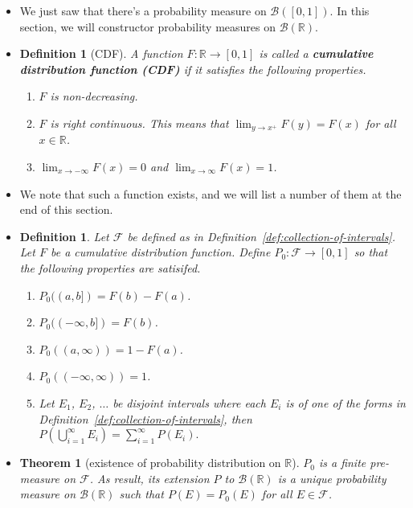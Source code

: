 \documentclass[10pt]{article}
\newtheorem{theorem}[lemma]{Theorem}
\newtheorem{definition}[lemma]{Definition}
\numberwithin{lemma}{section}
\newcommand{\mcal}[1]{\mathcal{#1}}
\newcommand{\Real}{\mathbb{R}}
\begin{document}
\begin{itemize}
  \item We just saw that there's a probability measure on $\mcal{B}([0,1])$. In this section, we will constructor probability measures on $\mcal{B}(\Real)$. 
    
  \item \begin{definition}[CDF] \label{def:cdf}
    A function $F: \Real \rightarrow [0,1]$ is called a {\bf cumulative distribution function (CDF)} if it satisfies the following properties.
    \begin{enumerate}
      \item $F$ is non-decreasing.
      \item $F$ is right continuous. This means that $\lim_{y \rightarrow x^+} F(y) = F(x)$ for all $x \in \Real$.
      \item $\lim_{x \rightarrow -\infty} F(x) = 0$ and $\lim_{x \rightarrow \infty} F(x) = 1$.
    \end{enumerate}
  \end{definition}

  \item We note that such a function exists, and we will list a number of them at the end of this section.

  \item \begin{definition}
    Let $\mcal{F}$ be defined as in Definition~\ref{def:collection-of-intervals}. Let $F$ be a cumulative distribution function. Define $P_0: \mcal{F} \rightarrow [0,1]$ so that the following properties are satisifed.
    \begin{enumerate}
      \item $P_0((a,b]) = F(b) - F(a)$.
      \item $P_0((-\infty,b]) = F(b)$.
      \item $P_0((a,\infty)) = 1 - F(a)$.
      \item $P_0((-\infty,\infty)) = 1$.
      \item Let $E_1$, $E_2$, $\dotsc$ be disjoint intervals where each $E_i$ is of one of the forms in Definition~\ref{def:collection-of-intervals}, then $P(\bigcup_{i=1}^\infty E_i) = \sum_{i=1}^\infty P(E_i).$ 
    \end{enumerate}
  \end{definition}

  \item \begin{theorem}[existence of probability distribution on $\Real$]
    $P_0$ is a finite pre-measure on $\mcal{F}$. As result, its extension $P$ to $\mcal{B}(\Real)$ is a unique probability measure on $\mcal{B}(\Real)$ such that $P(E) = P_0(E)$ for all $E \in \mcal{F}$.
  \end{theorem}


\end{itemize}
\end{document}
